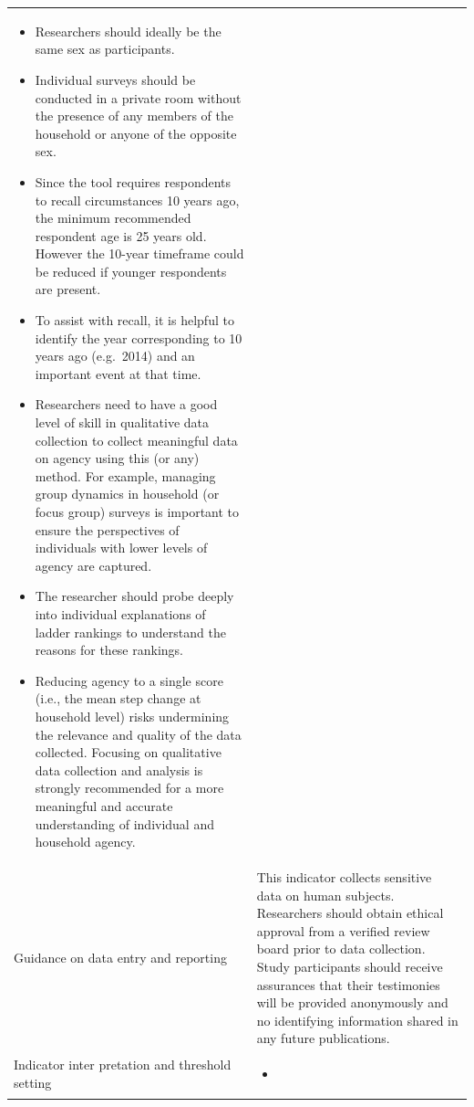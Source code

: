 \documentclass[
  letterpaper,
  DIV=11,
  numbers=noendperiod]{scrreprt}
\providecommand{\tightlist}{%
  \setlength{\itemsep}{0pt}\setlength{\parskip}{0pt}}
\begin{document}
\begin{longtable}[]{@{}
  >{\raggedright\arraybackslash}p{}
  >{\raggedright\arraybackslash}p{}@{}}
\begin{minipage}[t]{\linewidth}
\begin{itemize}
\item
  Researchers should ideally be the same sex as participants.
\item
  Individual surveys should be conducted in a private room without the
  presence of any members of the household or anyone of the opposite
  sex.
\item
  Since the tool requires respondents to recall circumstances 10 years
  ago, the minimum recommended respondent age is 25 years old. However
  the 10-year timeframe could be reduced if younger respondents are
  present.
\item
  To assist with recall, it is helpful to identify the year
  corresponding to 10 years ago (e.g.~2014) and an important event at
  that time.
\item
  Researchers need to have a good level of skill in qualitative data
  collection to collect meaningful data on agency using this (or any)
  method. For example, managing group dynamics in household (or focus
  group) surveys is important to ensure the perspectives of individuals
  with lower levels of agency are captured.
\item
  The researcher should probe deeply into individual explanations of
  ladder rankings to understand the reasons for these rankings.
\item
  Reducing agency to a single score (i.e., the mean step change at
  household level) risks undermining the relevance and quality of the
  data collected. Focusing on qualitative data collection and analysis
  is strongly recommended for a more meaningful and accurate
  understanding of individual and household agency.
\end{itemize}
\end{minipage} \\
Guidance on data entry and reporting & This indicator collects sensitive
data on human subjects. Researchers should obtain ethical approval from
a verified review board prior to data collection. Study participants
should receive assurances that their testimonies will be provided
anonymously and no identifying information shared in any future
publications. \\
Indicator inter pretation and threshold setting &
\begin{minipage}[t]{\linewidth}\raggedright
\begin{itemize}
\tightlist
\item
\end{itemize}
\end{minipage} \\

\end{longtable}
\end{document}
